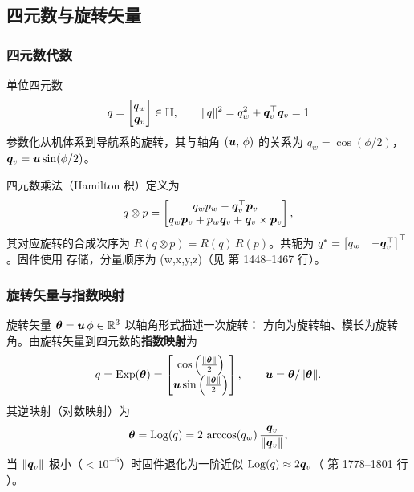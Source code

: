 \subsection{四元数与旋转矢量}

\subsubsection{四元数代数}

\begin{definition}[单位四元数]
单位四元数
\begin{equation}
  q = \begin{bmatrix} q_w \\ \boldsymbol{q}_v \end{bmatrix}
    \in \mathbb{H},\qquad \|q\|^2 = q_w^2 + \boldsymbol{q}_v^\top \boldsymbol{q}_v = 1
  \label{eq:quat-def}
\end{equation}
参数化从机体系到导航系的旋转，其与轴角 $\left(\boldsymbol{u},\,\phi\right)$ 的关系为
$q_w = \cos(\phi/2)$，$\boldsymbol{q}_v = \boldsymbol{u}\sin(\phi/2)$。
\end{definition}

四元数乘法（Hamilton 积）定义为
\begin{equation}
  q \otimes p =
  \begin{bmatrix}
    q_w p_w - \boldsymbol{q}_v^\top\boldsymbol{p}_v \\
    q_w \boldsymbol{p}_v + p_w \boldsymbol{q}_v + \boldsymbol{q}_v \times \boldsymbol{p}_v
  \end{bmatrix},
  \label{eq:quat-prod}
\end{equation}
其对应旋转的合成次序为 $R(q\otimes p) = R(q)\,R(p)$。共轭为
$q^{*} = \begin{bmatrix} q_w & -\boldsymbol{q}_v^\top \end{bmatrix}^{\top}$。固件使用
 存储，分量顺序为 (w,x,y,z)（见
 第 1448--1467 行）。

\subsubsection{旋转矢量与指数映射}

\begin{definition}[旋转矢量]
旋转矢量 $\boldsymbol{\theta} = \boldsymbol{u}\,\phi \in \mathbb{R}^3$ 以轴角形式描述一次旋转：
方向为旋转轴、模长为旋转角。由旋转矢量到四元数的\textbf{指数映射}为
\begin{equation}
  q = \operatorname{Exp}(\boldsymbol{\theta}) =
  \begin{bmatrix}
    \cos\left(\tfrac{\|\boldsymbol{\theta}\|}{2}\right) \\
    \boldsymbol{u}\sin\left(\tfrac{\|\boldsymbol{\theta}\|}{2}\right)
  \end{bmatrix},
  \qquad \boldsymbol{u} = \boldsymbol{\theta} / \|\boldsymbol{\theta}\|.
  \label{eq:exp-map}
\end{equation}
其逆映射（对数映射）为
\begin{equation}
  \boldsymbol{\theta} = \operatorname{Log}(q) = 2\,\arccos(q_w)\,\frac{\boldsymbol{q}_v}{\|\boldsymbol{q}_v\|},
  \label{eq:log-map}
\end{equation}
当 $\|\boldsymbol{q}_v\|$ 极小（$<10^{-6}$）时固件退化为一阶近似
$\operatorname{Log}(q) \approx 2\boldsymbol{q}_v$（ 第 1778--1801 行
）。
\end{definition}

